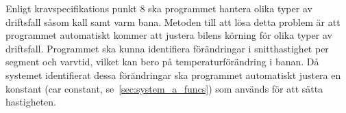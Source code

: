 Enligt kravspecifikations punkt 8 ska programmet hantera olika typer av
driftsfall såsom kall samt varm bana.  Metoden till att lösa detta problem är
att programmet automatiskt kommer att justera bilens körning för olika typer av
driftsfall. Programmet ska kunna identifiera förändringar i snitthastighet per
segment och varvtid, vilket kan bero på temperaturförändring i banan. Då systemet identifierat dessa förändringar ska programmet
automatiskt justera en konstant (car constant, se~\ref{sec:system_a_funcs}) som
används för att sätta hastigheten.
